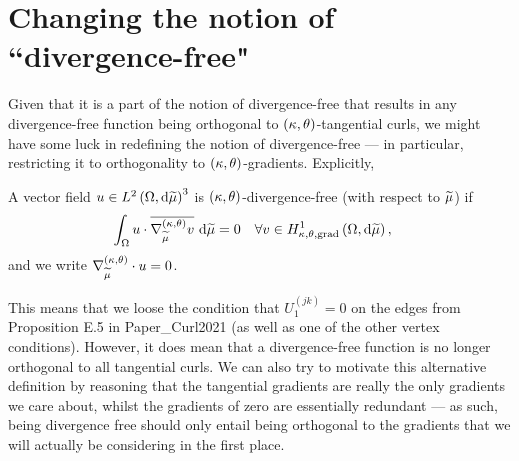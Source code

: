 \documentclass[11pt]{report}
\begin{document}
\section*{Changing the notion of ``divergence-free"}
Given that it is a part of the notion of divergence-free that results in any divergence-free function being orthogonal to $\left( \kappa, \theta \right)$-tangential curls, we might have some luck in redefining the notion of divergence-free --- in particular, restricting it to orthogonality to $\left( \kappa, \theta \right)$-gradients.
Explicitly,
\begin{definition}
	A vector field $u\in L^{2}\left( \Omega,\mathrm{d}\widetilde{\mu} \right)^3$ is $\left( \kappa, \theta \right)$-divergence-free (with respect to $\widetilde{\mu}$) if
	\begin{align*}
		\int_{\Omega} u\cdot\overline{\nabla^{\left( \kappa, \theta \right)}_{\widetilde{\mu}}v}  \ \mathrm{d}\widetilde{\mu} &=0 \quad\forall v\in H^1_{\kappa,\theta,\mathrm{grad}}\left( \Omega, \mathrm{d}\widetilde{\mu} \right),
	\end{align*}
	and we write $\nabla^{\left( \kappa, \theta \right)}_{\widetilde{\mu}}\cdot u = 0$.	
\end{definition}
This means that we loose the condition that $U_1^{(jk)}=0$ on the edges from Proposition E.5 in Paper\_Curl2021 (as well as one of the other vertex conditions).
However, it does mean that a divergence-free function is no longer orthogonal to all tangential curls.
We can also try to motivate this alternative definition by reasoning that the tangential gradients are really the only gradients we care about, whilst the gradients of zero are essentially redundant --- as such, being divergence free should only entail being orthogonal to the gradients that we will actually be considering in the first place.
\end{document}
